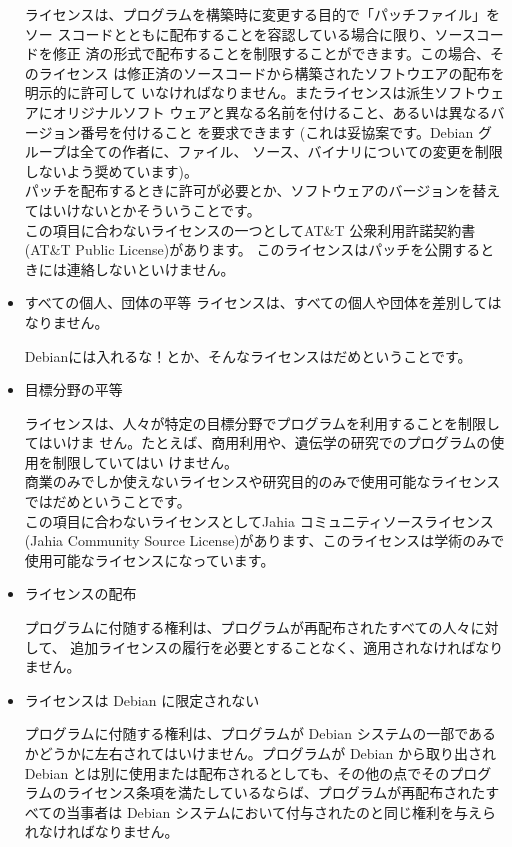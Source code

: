 \documentclass[mingoth,a4paper]{jsarticle}
\begin{document}
\begin{itemize}
ライセンスは、プログラムを構築時に変更する目的で「パッチファイル」をソー
スコードとともに配布することを容認している場合に限り、ソースコードを修正
済の形式で配布することを制限することができます。この場合、そのライセンス
は修正済のソースコードから構築されたソフトウエアの配布を明示的に許可して
いなければなりません。またライセンスは派生ソフトウェアにオリジナルソフト
ウェアと異なる名前を付けること、あるいは異なるバージョン番号を付けること
を要求できます (これは妥協案です。Debian グループは全ての作者に、ファイル、
ソース、バイナリについての変更を制限しないよう奨めています)。
\\

パッチを配布するときに許可が必要とか、ソフトウェアのバージョンを替えてはいけないとかそういうことです。
\\

この項目に合わないライセンスの一つとしてAT\&T 公衆利用許諾契約書 (AT\&T Public License)があります。
このライセンスはパッチを公開するときには連絡しないといけません。

 \item すべての個人、団体の平等
ライセンスは、すべての個人や団体を差別してはなりません。

Debianには入れるな！とか、そんなライセンスはだめということです。


 \item 目標分野の平等

ライセンスは、人々が特定の目標分野でプログラムを利用することを制限してはいけま
せん。たとえば、商用利用や、遺伝学の研究でのプログラムの使用を制限していてはい
けません。
\\

商業のみでしか使えないライセンスや研究目的のみで使用可能なライセンスではだめということです。
\\

この項目に合わないライセンスとしてJahia コミュニティソースライセンス (Jahia Community Source License)があります、このライセンスは学術のみで使用可能なライセンスになっています。
	  
 \item ライセンスの配布

プログラムに付随する権利は、プログラムが再配布されたすべての人々に対して、
追加ライセンスの履行を必要とすることなく、適用されなければなりません。


 \item ライセンスは Debian に限定されない

プログラムに付随する権利は、プログラムが Debian システムの一部であるかどうかに左右されてはいけません。プログラムが Debian から取り出され Debian とは別に使用または配布されるとしても、その他の点でそのプログラムのライセンス条項を満たしているならば、プログラムが再配布されたすべての当事者は Debian システムにおいて付与されたのと同じ権利を与えられなければなりません。
\\


\end{itemize}
\end{document}
